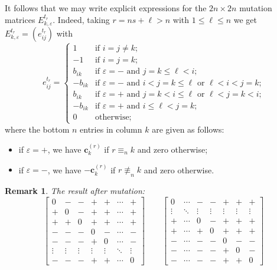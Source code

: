 \documentclass{amsart}
\newtheorem{remark}[theorem]{Remark}
\numberwithin{theorem}{section}
\newcommand{\bfc}{\boldsymbol{c}}
\begin{document}
  It follows that we may write explicit expressions for the $2n\times 2n$ mutation matrices $E^{t_r}_{k,\varepsilon}$.
  Indeed, taking $r=ns+\ell>n$ with $1 \le \ell \le n$ we get $E^{t_r}_{k,\varepsilon}=(e^{t_r}_{ij})$ with
  \begin{equation}
    \label{eq:postinjective mutation matrices}
    e^{t_r}_{ij}=
    \begin{cases}
      1 & \text{if $i=j\ne k$;}\\
      -1 & \text{if $i=j=k$;}\\
      b_{ik} & \text{if $\varepsilon=-$ and $j=k\le\ell<i$;}\\
      -b_{ik} & \text{if $\varepsilon=-$ and $i<j=k\le\ell$ or $\ell<i<j=k$;}\\
      b_{ik} & \text{if $\varepsilon=+$ and $j=k<i\le\ell$ or $\ell<j=k<i$;}\\
      -b_{ik} & \text{if $\varepsilon=+$ and $i\le\ell<j=k$;}\\
      0 & \text{otherwise;}
    \end{cases}
  \end{equation}
  where the bottom $n$ entries in column $k$ are given as follows:
  \begin{itemize}
    \item if $\varepsilon=+$, we have $\bfc^{(r)}_k$ if $r\equiv_n k$ and zero otherwise;
    \item if $\varepsilon=-$, we have $-\bfc^{(r)}_k$ if $r\not\equiv_n k$ and zero otherwise.
  \end{itemize}

  \begin{remark}
  The result after mutation:
  \[
    \left[\begin{array}{cc|c|cccc}
      0 & - & - & + & + & \cdots & +\\
      + & 0 & - & + & + & \cdots & +\\
      \hline
      + & + & 0 & + & + & \cdots & +\\
      \hline
      - & - & - & 0 & - & \cdots & -\\
      - & - & - & + & 0 & \cdots & -\\
      \vdots & \vdots & \vdots & \vdots & \vdots & \ddots & \vdots\\
      - & - & - & + & + & \cdots & 0
    \end{array}\right]
    \qquad
    \left[\begin{array}{cccc|c|cc}
      0 & \cdots & - & - & + & + & +\\
      \vdots & \ddots & \vdots & \vdots & \vdots & \vdots & \vdots\\
      + & \cdots & 0 & - & + & + & +\\
      + & \cdots & + & 0 & + & + & +\\
      \hline
      - & \cdots & - & - & 0 & - & -\\
      \hline
      - & \cdots & - & - & + & 0 & -\\
      - & \cdots & - & - & + & + & 0
    \end{array}\right]
  \]
  \end{remark}
\end{document}

